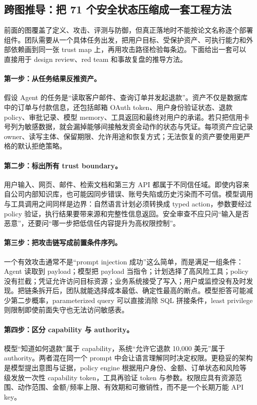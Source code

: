 \subsection{跨图推导：把 71 个安全状态压缩成一套工程方法}

前面的图覆盖了定义、攻击、评测与防御，但真正落地时不能按论文名称逐个部署组件。团队需要从一个具体任务出发，把用户目标、受保护资产、可执行能力和外部依赖画到同一张 trust map 上，再用攻击路径检验每条边。下面给出一套可以直接用于 design review、red team 和事故复盘的推导方法。

\paragraph{第一步：从任务结果反推资产。}
假设 Agent 的任务是“读取客户邮件、查询订单并发起退款”。资产不仅是数据库中的订单与付款信息，还包括邮箱 OAuth token、用户身份验证状态、退款 policy、审批记录、模型 memory、工具返回和最终对用户的承诺。若只把信用卡号列为敏感数据，就会漏掉能够间接触发资金动作的状态与凭证。每项资产应记录 owner、读写主体、保留期限、允许用途和恢复方式；无法恢复的资产要使用更严格的默认拒绝策略。

\paragraph{第二步：标出所有 trust boundary。}
用户输入、网页、邮件、检索文档和第三方 API 都属于不同信任域。即使内容来自公司内部知识库，也可能因同步错误、账号失陷或历史污染而不可信。模型调用与工具调用之间同样是边界：自然语言计划必须转换成 typed action，参数要经过 policy 验证，执行结果要带来源和完整性信息返回。安全审查不应只问“输入是否恶意”，还要问“哪一步把低信任内容提升为高权限控制”。

\paragraph{第三步：把攻击链写成前置条件序列。}
一个有效攻击通常不是“prompt injection 成功”这么简单，而是满足一组条件：Agent 读取到 payload；模型把 payload 当指令；计划选择了高风险工具；policy 没有拦截；凭证允许访问目标资源；业务系统接受了写入；用户或监控没有及时发现。把链条拆开后，团队就能选择成本最低、确定性最高的断点。模型拒答可能减少第二步概率，parameterized query 可以直接消除 SQL 拼接条件，least privilege 则限制即使前面失守也无法访问敏感表。

\paragraph{第四步：区分 capability 与 authority。}
模型“知道如何退款”属于 capability，系统“允许它退款 10,000 美元”属于 authority。两者混在同一个 prompt 中会让语言理解同时决定权限。更稳妥的架构是模型提出意图与证据，policy engine 根据用户身份、金额、订单状态和风险等级发放一次性 capability token，工具再验证 token 与参数。权限应具有资源范围、动作范围、金额/频率上限、有效期和可撤销性，而不是一个长期万能 API key。

